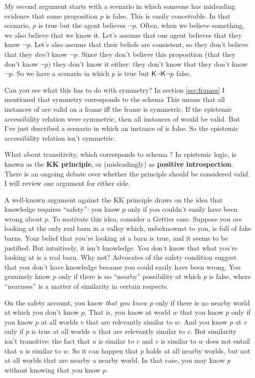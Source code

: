 My second argument starts with a scenario in which someone has misleading
evidence that some proposition $p$ is false. This is easily conceivable. In that
scenario, $p$ is true but the agent believes $\neg p$. Often, when we believe
something, we also believe that we know it. Let's assume that our agent believes
that they know $\neg p$. Let's also assume that their beliefs are consistent, so
they don't believe that they \emph{don't} know $\neg p$. Since they don't
believe this proposition (that they don't know $\neg p$) they don't know it
either: they don't know that they don't know $\neg p$. So we have a scenario in
which $p$ is true but $\operatorname{\mathsf{K}{}}\!\neg\!\operatorname{\mathsf{K}{}}\!\neg p$ false.

Can you see what this has to do with symmetry? In section \ref{sec:frames} I
mentioned that symmetry corresponds to the schema
%
%
This means that all instances of  are valid on a frame iff the frame is
symmetric. If the epistemic accessibility relation were symmetric, then all
instances of  would be valid. But I've just described a scenario in which
an instance of  is false. So the epistemic accessibility relation isn't
symmetric.

What about transitivity, which corresponds to schema ?
%
%
In epistemic logic,  is known as the \textbf{KK principle}, or
(misleadingly) as \textbf{positive introspection}. There is an ongoing debate
over whether the principle should be considered valid. I will review one
argument for either side.

A well-known argument against the KK principle draws on the idea that knowledge
requires ``safety'': you know $p$ only if you couldn't easily have been wrong
about $p$. To motivate this idea, consider a Gettier case. Suppose you are
looking at the only real barn in a valley which, unbeknownst to you, is full of
fake barns. Your belief that you're looking at a barn is true, and it seems to
be justified. But intuitively, it isn't knowledge. You don't know that what
you're looking at is a real barn. Why not? Advocates of the safety condition
suggest that you don't have knowledge because you could easily have been wrong.
You genuinely know $p$ only if there is no ``nearby'' possibility at which $p$
is false, where ``nearness'' is a matter of similarity in certain respects.

On the safety account, you know \emph{that you know $p$} only if there is no
nearby world at which you don't know $p$. That is, you know at world $w$ that
you know $p$ only if you know $p$ at all worlds $v$ that are relevantly similar
to $w$. And you know $p$ at $v$ only if $p$ is true at all worlds $u$ that are
relevantly similar to $v$. But similarity isn't transitive: the fact that $u$ is
similar to $v$ and $v$ is similar to $w$ does not entail that $u$ is similar to
$w$. So it can happen that $p$ holds at all nearby worlds, but not at all worlds
that are nearby a nearby world. In that case, you may know $p$ without knowing
that you know $p$.

